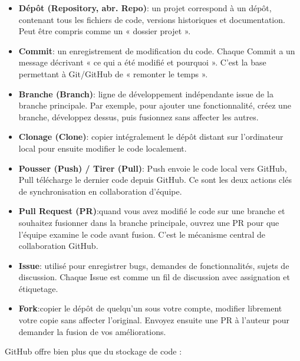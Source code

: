 \begin{itemize}
  \item \textbf{Dépôt (Repository, abr. Repo)}: un projet correspond à un dépôt, contenant tous les fichiers de code, versions historiques et documentation. Peut être compris comme un « dossier projet ».
  \item \textbf{Commit}: un enregistrement de modification du code. Chaque Commit a un message décrivant « ce qui a été modifié et pourquoi ». C’est la base permettant à Git/GitHub de « remonter le temps ».
  \item \textbf{Branche (Branch)}: ligne de développement indépendante issue de la branche principale. Par exemple, pour ajouter une fonctionnalité, créez une branche, développez dessus, puis fusionnez sans affecter les autres.
  \item \textbf{Clonage (Clone)}: copier intégralement le dépôt distant sur l’ordinateur local pour ensuite modifier le code localement.
  \item \textbf{Pousser (Push) / Tirer (Pull)}: Push envoie le code local vers GitHub, Pull télécharge le dernier code depuis GitHub. Ce sont les deux actions clés de synchronisation en collaboration d’équipe.
  \item \textbf{Pull Request (PR)}:quand vous avez modifié le code sur une branche et souhaitez fusionner dans la branche principale, ouvrez une PR pour que l’équipe examine le code avant fusion. C’est le mécanisme central de collaboration GitHub.
  \item \textbf{Issue}: utilisé pour enregistrer bugs, demandes de fonctionnalités, sujets de discussion. Chaque Issue est comme un fil de discussion avec assignation et étiquetage.
  \item \textbf{Fork}:copier le dépôt de quelqu’un sous votre compte, modifier librement votre copie sans affecter l’original. Envoyez ensuite une PR à l’auteur pour demander la fusion de vos améliorations.
\end{itemize}


GitHub offre bien plus que du stockage de code :

